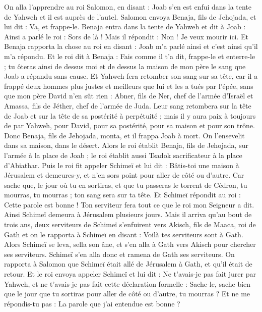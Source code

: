 \begin{multicols}{2}
On alla l'apprendre au roi Salomon, en disant : Joab s'en est enfui dans la tente de Yahweh et il est auprès de l'autel. Salomon envoya Benaja, fils de Jehojada, et lui dit : Va, et frappe-le.
Benaja entra dans la tente de Yahweh et dit à Joab : Ainsi a parlé le roi : Sors de là ! Mais il répondit : Non ! Je veux mourir ici. Et Benaja rapporta la chose au roi en disant : Joab m'a parlé ainsi et c'est ainsi qu'il m'a répondu.
Et le roi dit à Benaja : Fais comme il t'a dit, frappe-le et enterre-le ; tu ôteras ainsi de dessus moi et de dessus la maison de mon père le sang que Joab a répandu sans cause.
Et Yahweh fera retomber son sang sur sa tête, car il a frappé deux hommes plus justes et meilleurs que lui et les a tués par l'épée, sans que mon père David n'en sût rien : Abner, fils de Ner, chef de l'armée d'Israël et Amassa, fils de Jéther, chef de l'armée de Juda.
Leur sang retombera sur la tête de Joab et sur la tête de sa postérité à perpétuité ; mais il y aura paix à toujours de par Yahweh, pour David, pour sa postérité, pour sa maison et pour son trône.
Donc Benaja, fils de Jehojada, monta, et il frappa Joab à mort. On l'ensevelit dans sa maison, dans le désert.
Alors le roi établit Benaja, fils de Jehojada, sur l'armée à la place de Joab ; le roi établit aussi Tsadok sacrificateur à la place d'Abiathar.
Puis le roi fit appeler Schimeï et lui dit : Bâtis-toi une maison à Jérusalem et demeures-y, et n'en sors point pour aller de côté ou d'autre.
Car sache que, le jour où tu en sortiras, et que tu passeras le torrent de Cédron, tu mourras, tu mourras ; ton sang sera sur ta tête.
Et Schimeï répondit au roi : Cette parole est bonne ! Ton serviteur fera tout ce que le roi mon Seigneur a dit. Ainsi Schimeï demeura à Jérusalem plusieurs jours.
Mais il arriva qu'au bout de trois ans, deux serviteurs de Schimeï s'enfuirent vers Akisch, fils de Maaca, roi de Gath et on le rapporta à Schimeï en disant : Voilà tes serviteurs sont à Gath.
Alors Schimeï se leva, sella son âne, et s'en alla à Gath vers Akisch pour chercher ses serviteurs. Schimeï s'en alla donc et ramena de Gath ses serviteurs.
On rapporta à Salomon que Schimeï était allé de Jérusalem à Gath, et qu'il était de retour.
Et le roi envoya appeler Schimeï et lui dit : Ne t'avais-je pas fait jurer par Yahweh, et ne t'avais-je pas fait cette déclaration formelle : Sache-le, sache bien que le jour que tu sortiras pour aller de côté ou d'autre, tu mourras ? Et ne me répondis-tu pas : La parole que j'ai entendue est bonne ?

\end{multicols}
